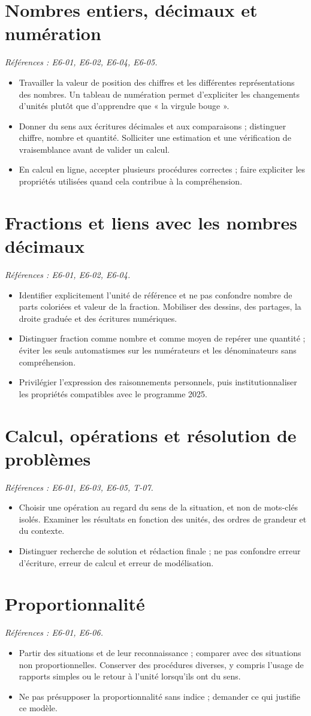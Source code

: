 \documentclass[11pt,a4paper]{article}
\newcommand{\sectionref}[2]{\section{#1}\textit{Références : #2.}\par}
\begin{document}
\sectionref{Nombres entiers, décimaux et numération}{E6-01, E6-02, E6-04, E6-05}
\begin{itemize}
\item Travailler la valeur de position des chiffres et les différentes représentations des nombres. Un tableau de numération permet d’expliciter les changements d’unités plutôt que d’apprendre que « la virgule bouge ».
\item Donner du sens aux écritures décimales et aux comparaisons ; distinguer chiffre, nombre et quantité. Solliciter une estimation et une vérification de vraisemblance avant de valider un calcul.
\item En calcul en ligne, accepter plusieurs procédures correctes ; faire expliciter les propriétés utilisées quand cela contribue à la compréhension.
\end{itemize}
\sectionref{Fractions et liens avec les nombres décimaux}{E6-01, E6-02, E6-04}
\begin{itemize}
\item Identifier explicitement l’unité de référence et ne pas confondre nombre de parts coloriées et valeur de la fraction. Mobiliser des dessins, des partages, la droite graduée et des écritures numériques.
\item Distinguer fraction comme nombre et comme moyen de repérer une quantité ; éviter les seuls automatismes sur les numérateurs et les dénominateurs sans compréhension.
\item Privilégier l’expression des raisonnements personnels, puis institutionnaliser les propriétés compatibles avec le programme 2025.
\end{itemize}
\sectionref{Calcul, opérations et résolution de problèmes}{E6-01, E6-03, E6-05, T-07}
\begin{itemize}
\item Choisir une opération au regard du sens de la situation, et non de mots-clés isolés. Examiner les résultats en fonction des unités, des ordres de grandeur et du contexte.
\item Distinguer recherche de solution et rédaction finale ; ne pas confondre erreur d’écriture, erreur de calcul et erreur de modélisation.
\end{itemize}
\sectionref{Proportionnalité}{E6-01, E6-06}
\begin{itemize}
\item Partir des situations et de leur reconnaissance ; comparer avec des situations non proportionnelles. Conserver des procédures diverses, y compris l’usage de rapports simples ou le retour à l’unité lorsqu’ils ont du sens.
\item Ne pas présupposer la proportionnalité sans indice ; demander ce qui justifie ce modèle.
\end{itemize}
\end{document}
